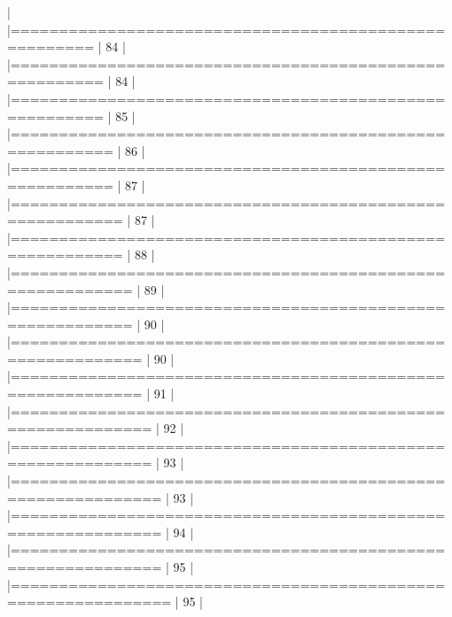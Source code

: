 \documentclass[10pt]{article}
\newenvironment{CodeChunk}{}{}
\begin{document}
\begin{CodeChunk}
\begin{CodeChunk}
\begin{CodeOutput}
  |                                                                       
  |======================================================           |  84%
  |                                                                       
  |=======================================================          |  84%
  |                                                                       
  |=======================================================          |  85%
  |                                                                       
  |========================================================         |  86%
  |                                                                       
  |========================================================         |  87%
  |                                                                       
  |=========================================================        |  87%
  |                                                                       
  |=========================================================        |  88%
  |                                                                       
  |==========================================================       |  89%
  |                                                                       
  |==========================================================       |  90%
  |                                                                       
  |===========================================================      |  90%
  |                                                                       
  |===========================================================      |  91%
  |                                                                       
  |============================================================     |  92%
  |                                                                       
  |============================================================     |  93%
  |                                                                       
  |=============================================================    |  93%
  |                                                                       
  |=============================================================    |  94%
  |                                                                       
  |=============================================================    |  95%
  |                                                                       
  |==============================================================   |  95%
  |                                                                       

\end{CodeOutput}
\end{CodeChunk}
\end{CodeChunk}
\end{document}
